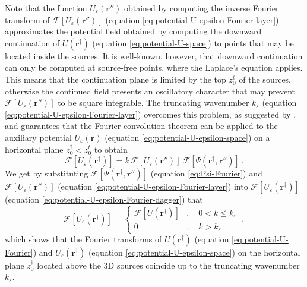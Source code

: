 Note that the function $U_{\varepsilon}(\mathbf{r}'')$ obtained by computing
the inverse Fourier transform of 
$\mathcal{F} \left[ U_{\varepsilon}(\mathbf{r}'') \right]$ (equation \ref{eq:potential-U-epsilon-Fourier-layer})
approximates the potential field obtained by 
computing the downward continuation of $U(\mathbf{r}^{\dagger})$ (equation \ref{eq:potential-U-space}) 
to points that may be located inside the sources. 
It is well-known, however, that downward continuation can only be computed at 
source-free points, where the Laplace's equation applies. This means that the
continuation plane is limited by the top $z^{t}_{0}$ of the sources, otherwise the continued field 
presents an oscillatory character \citep[e.g.,][]{roy1967, fedi_florio2002} that may
prevent $\mathcal{F} \left[ U_{\varepsilon}(\mathbf{r}'') \right]$ to be square integrable.
The truncating wavenumber $k_{\varepsilon}$ (equation \ref{eq:potential-U-epsilon-Fourier-layer}) 
overcomes this problem, as suggested by \citet{bhattacharyya1967},
and guarantees that the Fourier-convolution theorem 
can be applied to the auxiliary potential $U_{\varepsilon}(\mathbf{r})$
(equation \ref{eq:potential-U-epsilon-space}) on a horizontal plane $z^{\dagger}_{0} < z^{t}_{0}$ 
to obtain
\begin{equation}
	\mathcal{F} [ U_{\varepsilon}(\mathbf{r}^{\dagger}) ]
	= k \, \mathcal{F} [ U_{\varepsilon}(\mathbf{r}'') ] \:
	\mathcal{F} [ \Psi(\mathbf{r}^{\dagger}, \mathbf{r}'') ] \: .
	\label{eq:potential-U-epsilon-Fourier-dagger}
\end{equation}
We get by substituting 
$\mathcal{F} \left[ \Psi(\mathbf{r}^{\dagger}, \mathbf{r}'') \right]$
(equation \ref{eq:Psi-Fourier}) and 
$\mathcal{F} \left[ U_{\varepsilon}(\mathbf{r}'') \right]$
(equation \ref{eq:potential-U-epsilon-Fourier-layer}) into 
$\mathcal{F} [ U_{\varepsilon}(\mathbf{r}^{\dagger}) ]$ (equation \ref{eq:potential-U-epsilon-Fourier-dagger}) that
\begin{equation}
	\mathcal{F} [ U_{\varepsilon}(\mathbf{r}^{\dagger}) ] = 
	\begin{cases}
		\mathcal{F} [ U(\mathbf{r}^{\dagger}) ] &
		, \quad 0 < k \le k_{\varepsilon} \\
		0 & , \quad k > k_{\varepsilon} 
	\end{cases} \: ,
	\label{eq:potential-U-epsilon-Fourier-dagger2}
\end{equation}
which shows that the Fourier transforms of 
$U(\mathbf{r}^{\dagger})$ (equation \ref{eq:potential-U-Fourier}) and 
$U_{\varepsilon}(\mathbf{r}^{\dagger})$ (equation \ref{eq:potential-U-epsilon-space}) 
on the horizontal plane $z^{\dagger}_{0}$ located above the 3D sources coincide up 
to the truncating wavenumber $k_{\varepsilon}$.

